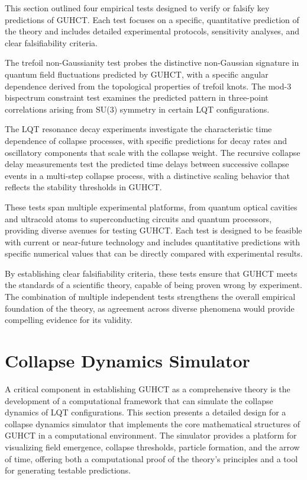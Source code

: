 \documentclass[11pt,a4paper]{article}
\begin{document}
\begin{intuitivesummary}
This section outlined four empirical tests designed to verify or falsify key predictions of GUHCT. Each test focuses on a specific, quantitative prediction of the theory and includes detailed experimental protocols, sensitivity analyses, and clear falsifiability criteria.

The trefoil non-Gaussianity test probes the distinctive non-Gaussian signature in quantum field fluctuations predicted by GUHCT, with a specific angular dependence derived from the topological properties of trefoil knots. The mod-3 bispectrum constraint test examines the predicted pattern in three-point correlations arising from SU(3) symmetry in certain LQT configurations.

The LQT resonance decay experiments investigate the characteristic time dependence of collapse processes, with specific predictions for decay rates and oscillatory components that scale with the collapse weight. The recursive collapse delay measurements test the predicted time delays between successive collapse events in a multi-step collapse process, with a distinctive scaling behavior that reflects the stability thresholds in GUHCT.

These tests span multiple experimental platforms, from quantum optical cavities and ultracold atoms to superconducting circuits and quantum processors, providing diverse avenues for testing GUHCT. Each test is designed to be feasible with current or near-future technology and includes quantitative predictions with specific numerical values that can be directly compared with experimental results.

By establishing clear falsifiability criteria, these tests ensure that GUHCT meets the standards of a scientific theory, capable of being proven wrong by experiment. The combination of multiple independent tests strengthens the overall empirical foundation of the theory, as agreement across diverse phenomena would provide compelling evidence for its validity.
\end{intuitivesummary}

\section{Collapse Dynamics Simulator}
\label{sec:simulator}

A critical component in establishing GUHCT as a comprehensive theory is the development of a computational framework that can simulate the collapse dynamics of LQT configurations. This section presents a detailed design for a collapse dynamics simulator that implements the core mathematical structures of GUHCT in a computational environment. The simulator provides a platform for visualizing field emergence, collapse thresholds, particle formation, and the arrow of time, offering both a computational proof of the theory's principles and a tool for generating testable predictions.
\end{document}
